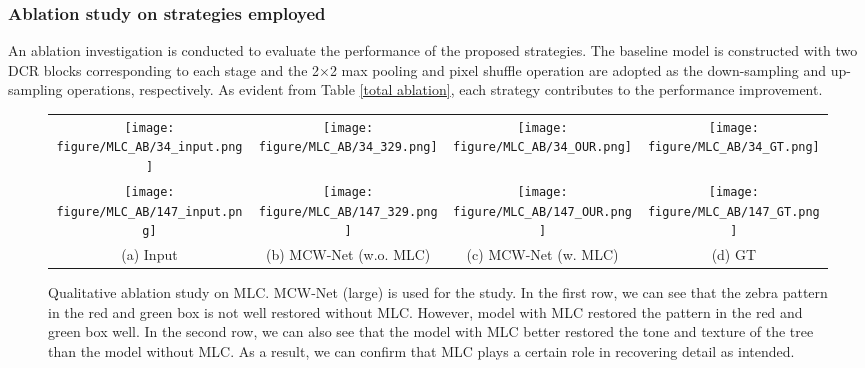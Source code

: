 \documentclass[a4paper,fleqn]{cas-dc}
\begin{document}
\subsubsection{Ablation study on strategies employed} 
An ablation investigation is conducted to evaluate the performance of the proposed strategies. The baseline model is constructed with two DCR blocks corresponding to each stage and the 2$\times$2 max pooling and pixel shuffle operation are adopted as the down-sampling and up-sampling operations, respectively. As evident from Table \ref{total ablation}, each strategy contributes to the performance improvement.



\begin{figure*}[!t]\footnotesize
	\centering
	\setlength{\tabcolsep}{0pt}
	
	\begin{tabular}{cclcclcclccl}
	    \multicolumn{3}{c}{\texttt{[image: figure/MLC\_AB/34\_input.png]}} &
		\multicolumn{3}{c}{\texttt{[image: figure/MLC\_AB/34\_329.png]}} &
		\multicolumn{3}{c}{\texttt{[image: figure/MLC\_AB/34\_OUR.png]}} &
		\multicolumn{3}{c}{\texttt{[image: figure/MLC\_AB/34\_GT.png]}}
		\\
		\multicolumn{3}{c}{\texttt{[image: figure/MLC\_AB/147\_input.png]}} &
		\multicolumn{3}{c}{\texttt{[image: figure/MLC\_AB/147\_329.png]}} &
		\multicolumn{3}{c}{\texttt{[image: figure/MLC\_AB/147\_OUR.png]}} &
		\multicolumn{3}{c}{\texttt{[image: figure/MLC\_AB/147\_GT.png]}}
		\\
		\multicolumn{3}{c}{(a) {Input}} &
		\multicolumn{3}{c}{(b) {MCW-Net (w.o. MLC)}} &
		\multicolumn{3}{c}{(c) {MCW-Net (w. MLC)}} &
		\multicolumn{3}{c}{(d) {GT}}
	\end{tabular}
	\caption{Qualitative ablation study on MLC. MCW-Net (large) is used for the study. In the first row, we can see that the zebra pattern in the red and green box is not well restored without MLC. However, model with MLC restored the pattern in the red and green box well. In the second row, we can also see that the model with MLC better restored the tone and texture of the tree than the model without MLC. As a result, we can confirm that MLC plays a certain role in recovering detail as intended.}

	\label{fig:mlc_ablation}
\end{figure*}
\end{document}
